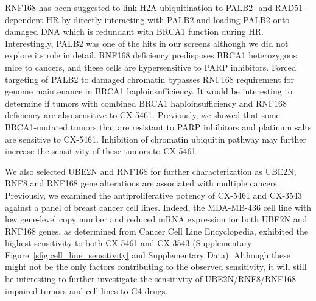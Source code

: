 RNF168 has been suggested to link H2A ubiquitination to PALB2- and RAD51-dependent HR by directly interacting with PALB2 and loading PALB2 onto damaged DNA which is redundant with BRCA1 function during HR\cite{zhang2009,Zhang2009a,sy2009,Luijsterburg2017a}. Interestingly, PALB2 was one of the hits in our screens although we did not explore its role in detail. RNF168 deficiency predisposes BRCA1 heterozygous mice to cancers, and these cells are  hypersensitive to PARP inhibitors\cite{zong2019}. Forced targeting of PALB2 to damaged chromatin bypasses RNF168 requirement for genome maintenance in BRCA1 haploinsufficiency. It would be interesting to determine if tumors with combined BRCA1 haploinsufficiency and RNF168 deficiency are also sensitive to CX-5461. Previously, we showed that some BRCA1-mutated tumors that are resistant to PARP inhibitors and platinum salts are sensitive to  CX-5461\cite{Xu2017}. Inhibition of chromatin ubiquitin pathway may further increase the sensitivity of these tumors to CX-5461.
  

We also selected UBE2N and RNF168 for further characterization as UBE2N, RNF8 and RNF168 gene alterations are associated with multiple cancers. 
Previously, we examined the antiproliferative potency of CX-5461 and CX-3543 against a panel of breast cancer cell lines\cite{Xu2017}. Indeed, the MDA-MB-436 cell line with low gene-level copy number and reduced mRNA expression for both UBE2N and RNF168 genes, as determined from Cancer Cell Line Encyclopedia, exhibited the highest sensitivity to both CX-5461 and CX-3543 (Supplementary Figure~\ref{sfig:cell_line_sensitivity} and Supplementary Data)\cite{Barretina2012,Xu2017}. 
Although these might not be the only factors contributing to the observed sensitivity, it will still be interesting to further investigate the sensitivity of UBE2N/RNF8/RNF168-impaired tumors and cell lines to G4 drugs. 

